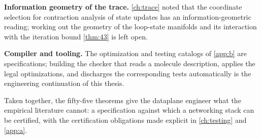\textbf{Information geometry of the trace.} \autoref{ch:trace} noted that the coordinate selection for contraction analysis of state updates has an information-geometric reading; working out the geometry of the loop-state manifolds and its interaction with the iteration bound \ref{thm:43} is left open.

\textbf{Compiler and tooling.} The optimization and testing catalogs of \autoref{app:b} are specifications; building the checker that reads a molecule description, applies the legal optimizations, and discharges the corresponding tests automatically is the engineering continuation of this thesis.

Taken together, the fifty-five theorems give the dataplane engineer what the empirical literature cannot: a specification against which a networking stack can be certified, with the certification obligations made explicit in \autoref{ch:testing} and \autoref{app:a}.
